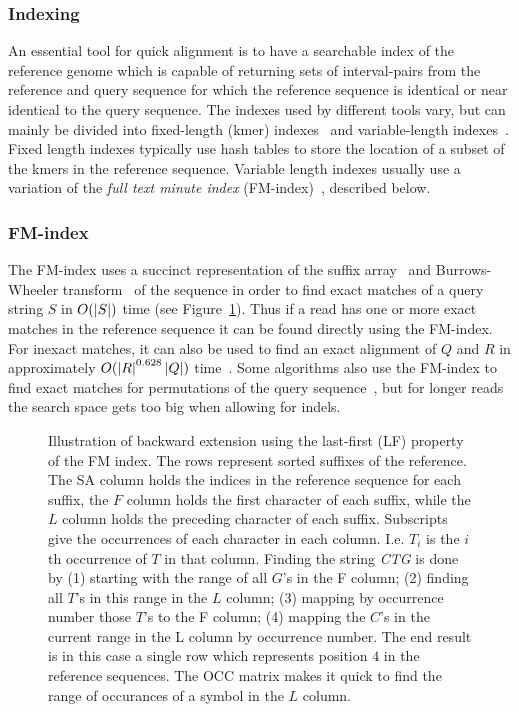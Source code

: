 \subsubsection{Indexing}
An essential tool for quick alignment is to have a searchable index of the reference genome which is capable of returning sets of interval-pairs from the reference and query sequence for which the reference sequence is identical or near identical to the query sequence.
The indexes used by different tools vary, but can mainly be divided into fixed-length (kmer) indexes~\cite{minimap} and variable-length indexes~\cite{bowtie2, bwalong}.
Fixed length indexes typically use hash tables to store the location of a subset of the kmers in the reference sequence.
Variable length indexes usually use a variation of the \emph{full text minute index} (FM-index)~\cite{fm}, described below.

\subsubsection{FM-index}
The FM-index uses a succinct representation of the suffix array~\cite{suffixarray} and Burrows-Wheeler transform~\cite{BWT} of the sequence in order to find exact matches of a query string $S$ in $O(\left|S\right|)$ time (see Figure~\ref{fig:FM}).
Thus if a read has one or more exact matches in the reference sequence it can be found directly using the FM-index.
For inexact matches, it can also be used to find an exact alignment of $Q$ and $R$ in approximately $O(\left|R\right|^{0.628}\left|Q\right|)$ time~\cite{bwtsw, bwalong}.
Some algorithms also use the FM-index to find exact matches for permutations of the query sequence~\cite{bowtie1, bwashort}, but for longer reads the search space gets too big when allowing for indels.
\begin{figure}
  \tikzpicture
  
  \endtikzpicture
  \caption{Illustration of backward extension using the last-first (LF) property of the FM index.
    The rows represent sorted suffixes of the reference. The SA column holds the indices in the reference sequence for each suffix, the $F$ column holds the first character of each suffix, while the $L$ column holds the preceding character of each suffix.
    Subscripts give the occurrences of each character in each column. I.e. $T_i$ is the $i$th occurrence of $T$ in that column. Finding the string \emph{CTG} is done by (1) starting with the range of all $G$'s in the F column; (2) finding all $T$'s in this range in the $L$ column; (3) mapping by occurrence number those $T$'s to the F column; (4) mapping the $C$'s in the current range in the L column by occurrence number. The end result is in this case a single row which represents position $4$ in the reference sequences.
    The OCC matrix makes it quick to find the range of occurances of a symbol in the $L$ column.
  }
  \label{fig:FM}

\end{figure}

